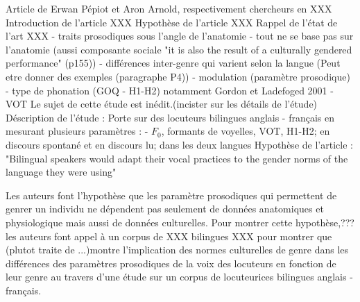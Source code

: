 Article de Erwan Pépiot et Aron Arnold, respectivement chercheurs en XXX
Introduction de l'article XXX
Hypothèse de l'article XXX
Rappel de l'état de l'art XXX
- traits prosodiques sous l'angle de l'anatomie
- tout ne se base pas sur l'anatomie (aussi composante sociale "it is also the result of a culturally gendered performance" (p155))
- différences inter-genre qui varient selon la langue (Peut etre donner des exemples (paragraphe P4))
- modulation (paramètre prosodique)
- type de phonation (GOQ - H1-H2)
   notamment Gordon et Ladefoged 2001
- VOT
Le sujet de cette étude est inédit.(incister sur les détails de l'étude)
Déscription de l'étude :
   Porte sur des locuteurs bilingues anglais - français en mesurant plusieurs paramètres :
      - $F_0$, formants de voyelles, VOT, H1-H2; en discours spontané et en discours lu; dans les deux langues
Hypothèse de l'article : 
"Bilingual speakers would adapt their vocal practices to the gender norms of the language they were using"

 Les auteurs font l'hypothèse que les paramètre prosodiques qui permettent de genrer un individu ne dépendent pas seulement de données anatomiques et physiologique mais aussi de données culturelles. Pour montrer cette hypothèse,??? les auteurs font appel à un corpus de XXX bilingues XXX pour montrer que 
(plutot traite de ...)montre l'implication des normes culturelles de genre dans les différences des paramètres prosodiques de la voix des locuteurs en fonction de leur genre au travers d'une étude sur un corpus de locuteurices bilingues anglais - français.
